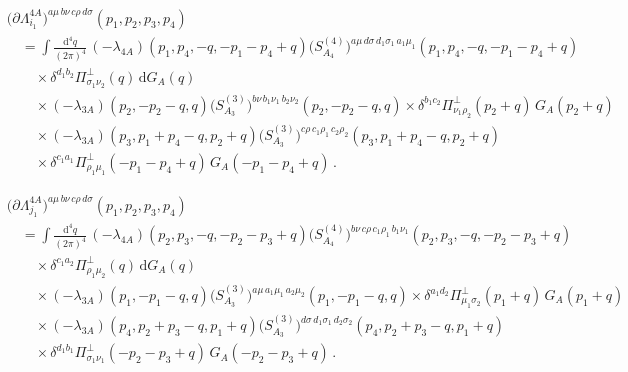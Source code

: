 \documentclass[11pt,a4paper]{article}
\begin{document}
\begin{align}
&\bigl(\partial\Lambda^{4A}_{i_1}\bigr)^{a\mu\,b\nu\,c\rho\,d\sigma}(p_1,p_2,p_3,p_4)
\nonumber\\
&\quad=
\int\frac{\mathrm{d}^4q}{(2\pi)^4}\,
(-\lambda_{4A})(p_1,p_4,-q,-p_1-p_4+q)
\bigl(S^{(4)}_{A_4}\bigr)^{a\mu\,d\sigma\,d_1\sigma_1\,a_1\mu_1}(p_1,p_4,-q,-p_1-p_4+q)
\nonumber\\
&\qquad\times
\delta^{d_1b_2}\Pi^\perp_{\sigma_1\nu_2}(q)\,\mathrm{d}G_A(q)
\nonumber\\
&\qquad\times
(-\lambda_{3A})(p_2,-p_2-q,q)
\bigl(S^{(3)}_{A_3}\bigr)^{b\nu\,b_1\nu_1\,b_2\nu_2}(p_2,-p_2-q,q)
\times
\delta^{b_1c_2}\Pi^\perp_{\nu_1\rho_2}(p_2+q)\,G_A(p_2+q)
\nonumber\\
&\qquad\times
(-\lambda_{3A})(p_3,p_1+p_4-q,p_2+q)
\bigl(S^{(3)}_{A_3}\bigr)^{c\rho\,c_1\rho_1\,c_2\rho_2}(p_3,p_1+p_4-q,p_2+q)
\nonumber\\
&\qquad\times
\delta^{c_1a_1}\Pi^\perp_{\rho_1\mu_1}(-p_1-p_4+q)\,G_A(-p_1-p_4+q)\,.
\label{eq:dLam-i1}
\end{align}

\begin{align}
&\bigl(\partial\Lambda^{4A}_{j_1}\bigr)^{a\mu\,b\nu\,c\rho\,d\sigma}(p_1,p_2,p_3,p_4)
\nonumber\\
&\quad=
\int\frac{\mathrm{d}^4q}{(2\pi)^4}\,
(-\lambda_{4A})(p_2,p_3,-q,-p_2-p_3+q)
\bigl(S^{(4)}_{A_4}\bigr)^{b\nu\,c\rho\,c_1\rho_1\,b_1\nu_1}(p_2,p_3,-q,-p_2-p_3+q)
\nonumber\\
&\qquad\times
\delta^{c_1a_2}\Pi^\perp_{\rho_1\mu_2}(q)\,\mathrm{d}G_A(q)
\nonumber\\
&\qquad\times
(-\lambda_{3A})(p_1,-p_1-q,q)
\bigl(S^{(3)}_{A_3}\bigr)^{a\mu\,a_1\mu_1\,a_2\mu_2}(p_1,-p_1-q,q)
\times
\delta^{a_1d_2}\Pi^\perp_{\mu_1\sigma_2}(p_1+q)\,G_A(p_1+q)
\nonumber\\
&\qquad\times
(-\lambda_{3A})(p_4,p_2+p_3-q,p_1+q)
\bigl(S^{(3)}_{A_3}\bigr)^{d\sigma\,d_1\sigma_1\,d_2\sigma_2}(p_4,p_2+p_3-q,p_1+q)
\nonumber\\
&\qquad\times
\delta^{d_1b_1}\Pi^\perp_{\sigma_1\nu_1}(-p_2-p_3+q)\,G_A(-p_2-p_3+q)\,.
\label{eq:dLam-j1}
\end{align}
\end{document}
